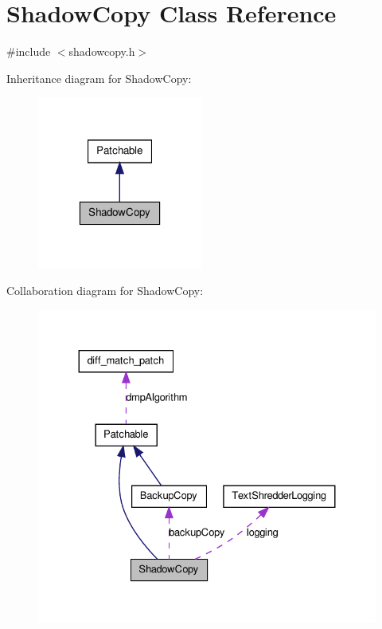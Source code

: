 \hypertarget{class_shadow_copy}{
\section{ShadowCopy Class Reference}
\label{class_shadow_copy}
}


{\ttfamily \#include $<$shadowcopy.h$>$}



Inheritance diagram for ShadowCopy:\nopagebreak
\begin{figure}[H]
\begin{center}
\leavevmode
\includegraphics[width=154pt]{class_shadow_copy__inherit__graph}
\end{center}
\end{figure}


Collaboration diagram for ShadowCopy:\nopagebreak
\begin{figure}[H]
\begin{center}
\leavevmode
\includegraphics[width=330pt]{class_shadow_copy__coll__graph}
\end{center}
\end{figure}

